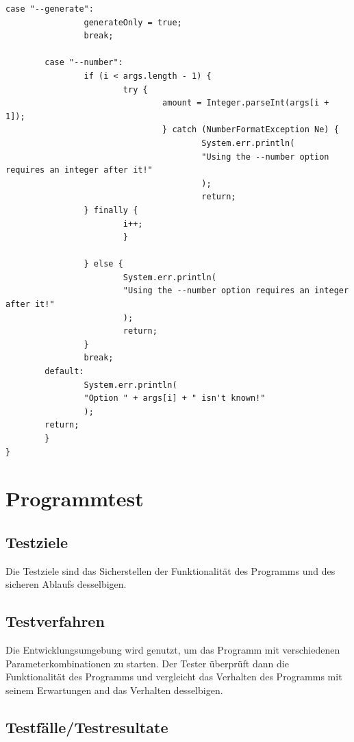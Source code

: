 \documentclass[11pt]{article}
\begin{document}
\begin{lstlisting}[caption=Überprüfung der Programmparameter, label=lst:checkParameter]
        case "--generate":
                generateOnly = true;
                break;
                
        case "--number":
                if (i < args.length - 1) {
                        try {
                                amount = Integer.parseInt(args[i + 1]);
                                } catch (NumberFormatException Ne) {
                                        System.err.println(
                                        "Using the --number option requires an integer after it!"
                                        );
                                        return;
                } finally {
                        i++;
                        }
                        
                } else {
                        System.err.println(
                        "Using the --number option requires an integer after it!"
                        );
                        return;
                }
                break;
        default:
                System.err.println(
                "Option " + args[i] + " isn't known!"
                );
        return;
        }
}
\end{lstlisting}
  
   \section{Programmtest}
  \subsection{Testziele}
  Die Testziele sind das Sicherstellen der Funktionalität des Programms und des sicheren Ablaufs desselbigen.
  
  \subsection{Testverfahren}
Die Entwicklungsumgebung wird genutzt, um das Programm mit verschiedenen Parameterkombinationen zu starten. Der Tester überprüft dann die Funktionalität des Programms und vergleicht das Verhalten des Programms mit seinem Erwartungen and das Verhalten desselbigen.
  \subsection{Testfälle/Testresultate}
\end{document}
